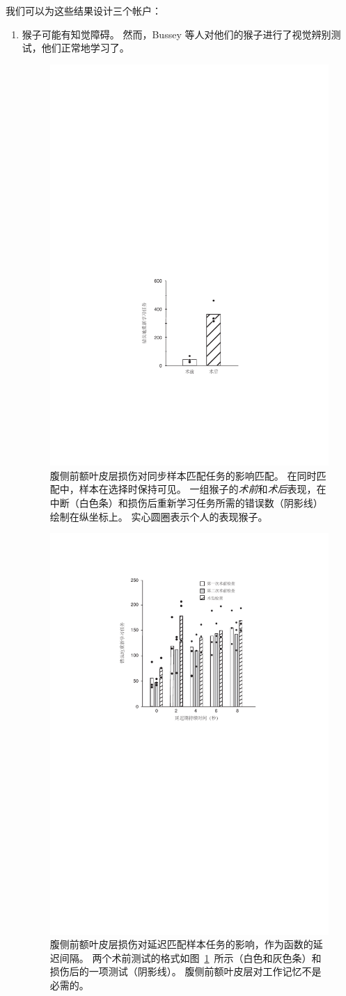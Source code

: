 我们可以为这些结果设计三个帐户：
\begin{enumerate}
\item 猴子可能有知觉障碍。 
然而，Bussey 等人\cite{bussey2001role}对他们的猴子进行了视觉辨别测试，他们正常地学习了。


\begin{figure}
	\centering
	\includegraphics[width=0.45\linewidth]{chap7/7_3}
	\caption{腹侧前额叶皮层损伤对同步样本匹配任务的影响匹配。
		在同时匹配中，样本在选择时保持可见。
		一组猴子的\textit{术前}和\textit{术后}表现，在中断（白色条）和损伤后重新学习任务所需的错误数（阴影线）绘制在纵坐标上。
		实心圆圈表示个人的表现猴子\cite{rushworth1997ventral}。\label{fig:7_3}}
\end{figure}


\begin{figure}
	\centering
	\includegraphics[width=0.64\linewidth]{chap7/7_4}
	\caption{腹侧前额叶皮层损伤对延迟匹配样本任务的影响，作为函数的延迟间隔。 
		两个术前测试的格式如图~\ref{fig:7_3}~所示（白色和灰色条）和损伤后的一项测试（阴影线）。
		腹侧前额叶皮层对工作记忆不是必需的\cite{rushworth1997ventral}。\label{fig:7_4}}
\end{figure}



\end{enumerate}
